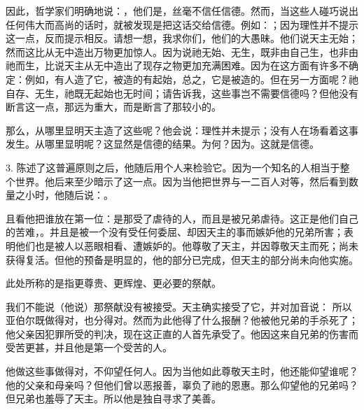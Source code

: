 因此，哲学家们明确地说：，他们是，丝毫不信任信德。然而，当这些人碰巧说出任何伟大而高尚的话时，就被发现是把这话交给信德。例如：；因为理性并不提示这一点，反而提示相反。请想一想，我求你们，他们的大愚昧。他们说天主无始；然而这比从无中造出万物更加惊人。因为说祂无始、无生，既非由自己生，也非由祂而生，比说天主从无中造出了现存之物更加充满困难。因为在这方面有许多不确定：例如，有人造了它，被造的有起始，总之，它是被造的。但在另一方面呢？祂自存、无生，祂既无起始也无时间；请告诉我，这些事岂不需要信德吗？但他没有断言这一点，那远为重大，而是断言了那较小的。\par

那么，从哪里显明天主造了这些呢？他会说：理性并未提示；没有人在场看着这事发生。从哪里显明呢？这显然是信德的结果。为何？因为。这就是信德。\par

3. 陈述了这普遍原则之后，他随后用个人来检验它。因为一个知名的人相当于整个世界。他后来至少暗示了这一点。因为当他把世界与一二百人对等，然后看到数量之小时，他随后说：。\par

且看他把谁放在第一位：是那受了虐待的人，而且是被兄弟虐待。这正是他们自己的苦难，。并且是被一个没有受任何委屈、却因天主的事而嫉妒他的兄弟所害；表明他们也是被人以恶眼相看、遭嫉妒的。他尊敬了天主，并因尊敬天主而死；尚未获得复活。但他的预备是明显的，他的部分已完成，但天主的部分尚未向他实施。\par

此处所称的是指更尊贵、更辉煌、更必要的祭献。\par

我们不能说（他说）那祭献没有被接受。天主确实接受了它，并对加音说： 所以亚伯尔既做得对，也分得对。然而为此他得了什么报酬？他被他兄弟的手杀死了；他父亲因犯罪所受的判决，现在这正直的人首先承受了。他因这来自兄弟的伤害而受苦更甚，并且他是第一个受苦的人。\par

他做这些事做得对，不仰望任何人。因为当他如此尊敬天主时，他还能仰望谁呢？他的父亲和母亲吗？但他们曾以恶报善，辜负了祂的恩惠。那么仰望他的兄弟吗？但兄弟也羞辱了天主。所以他是独自寻求了美善。\par

